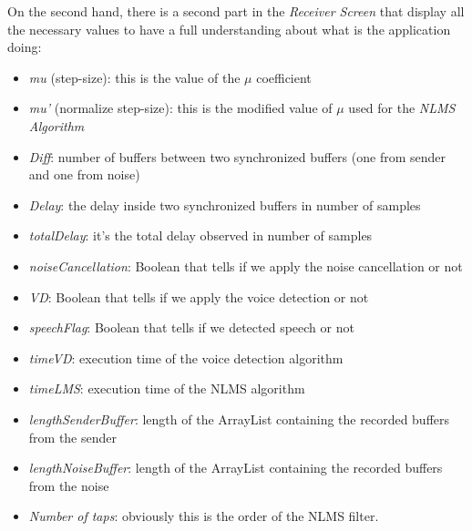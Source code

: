 \documentclass[11pt,a4paper,english]{book}  %
\theoremstyle{definition}  %
\theoremstyle{plain}  %
\theoremstyle{remark}  %
\begin{document}
	On the second hand, there is a second part in the \textit{Receiver Screen} that display all the necessary values to have a full understanding about what is the application doing:	
	
	\begin{itemize}
	\item \textit{mu} (step-size): this is the value of the $\mu$ coefficient
	\item \textit{mu'} (normalize step-size): this is the modified value of $\mu$ used for the  \textit{NLMS Algorithm}
	\item \textit{Diff}: number of buffers between two synchronized buffers (one from sender and one from noise)
	\item \textit{Delay}: the delay inside two synchronized buffers in number of samples
	\item \textit{totalDelay}: it’s the total delay observed in number of samples
	\item \textit{noiseCancellation}: Boolean that tells if we apply the noise cancellation or not
	\item \textit{VD}: Boolean that tells if we apply the voice detection or not
	\item \textit{speechFlag}: Boolean that tells if we detected speech or not
	\item \textit{timeVD}: execution time of the voice detection algorithm
	\item \textit{timeLMS}: execution time of the NLMS algorithm
	\item\textit{lengthSenderBuffer}: length of the ArrayList containing the recorded buffers from the sender
	\item \textit{lengthNoiseBuffer}: length of the ArrayList containing the recorded buffers from the noise
	\item \textit{Number of taps}: obviously this is the order of the NLMS filter.
	
	\end{itemize}

	
	
\end{document}
